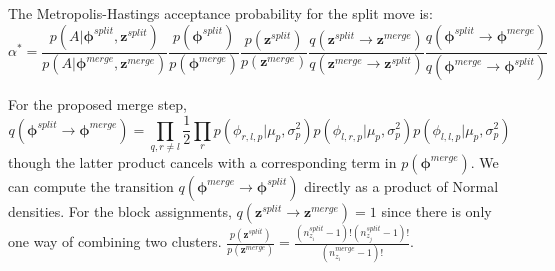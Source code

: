 \documentclass{article}
\begin{document}
The Metropolis-Hastings acceptance probability for the split move is: $$\alpha^* =\frac{p(A|\boldsymbol{\phi}^{split},\mathbf{z}^{split})}{p(A|\boldsymbol{\phi}^{merge},\mathbf{z}^{merge})}  \frac{p(\boldsymbol{\phi}^{split})}{p(\boldsymbol{\phi}^{merge})} \frac{p(\mathbf{z}^{split})}{p(\mathbf{z}^{merge})} \frac{q(\mathbf{z}^{split} \rightarrow \mathbf{z}^{merge})}{q( \mathbf{z}^{merge} \rightarrow \mathbf{z}^{split})} \frac{q(\boldsymbol{\phi}^{split} \rightarrow \boldsymbol{\phi}^{merge})}{q(\boldsymbol{\phi}^{merge} \rightarrow \boldsymbol{\phi}^{split})}$$

For the proposed merge step,
$$q(\boldsymbol{\phi}^{split} \rightarrow
\boldsymbol{\phi}^{merge}) = \prod_{q,r \ne l}\frac{1}{2} \prod_r p(\phi_{r,l,p}|\mu_p,\sigma_p^2)p(\phi_{l,r,p}|\mu_p,\sigma_p^2) p(\phi_{l,l,p}|\mu_p,\sigma_p^2)$$ though the latter product cancels with a corresponding term in $p(\boldsymbol{\phi}^{merge})$.  We can compute the transition $q(\boldsymbol{\phi}^{merge} \rightarrow \boldsymbol{\phi}^{split})$ directly as a product of Normal densities.  For the block assignments, $q(\mathbf{z}^{split} \rightarrow \mathbf{z}^{merge})=1$ since  there is only one way of combining two clusters.  $ \frac{p(\mathbf{z}^{split})}{p(\mathbf{z}^{merge})} = \frac{(n_{z_i}^{split} - 1)!(n_{z_j}^{split} - 1)!}{(n_{z_i}^{merge}-1)!}$.   



\end{document}
